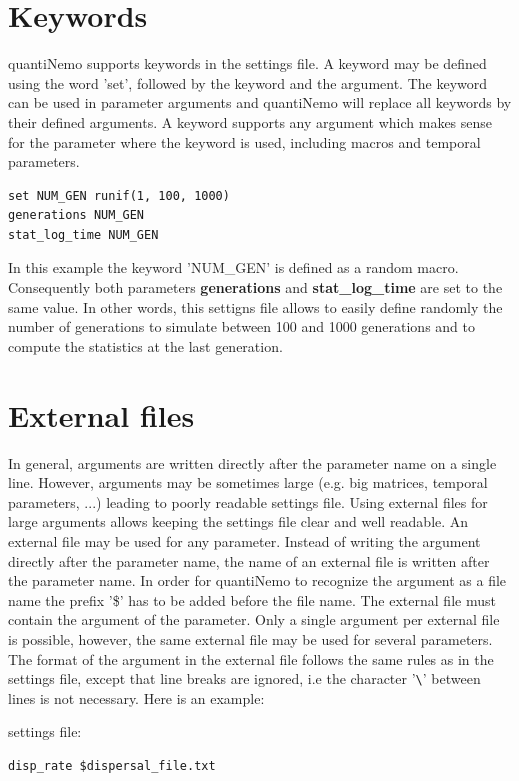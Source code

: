\documentclass[letterpaper,12pt,oneside]{book}
\begin{document}
\section{Keywords}
quantiNemo supports keywords in the settings file. A keyword may be defined using the word 'set', followed by the keyword and the argument. The keyword can be used in parameter arguments and quantiNemo will replace all keywords by their defined arguments. A keyword supports any argument which makes sense for the parameter where the keyword is used, including macros and temporal parameters.

\begin{lstlisting}[frame=single]
set NUM_GEN runif(1, 100, 1000)
generations NUM_GEN
stat_log_time NUM_GEN
\end{lstlisting}
In this example the keyword 'NUM\_GEN' is defined as a random macro. Consequently both parameters \textbf{generations} and \textbf{stat\_log\_time} are set to the same value. In other words, this settigns file allows to easily define randomly the number of generations to simulate between 100 and 1000 generations and to compute the statistics at the last generation.

\section{External files} \index{\$}
In general, arguments are written directly after the parameter name on a single line. However, arguments may be sometimes large (e.g. big matrices, temporal parameters, ...) leading to poorly readable settings file. Using external files for large arguments allows keeping the settings file clear and well readable. An external file may be used for any parameter. Instead of writing the argument directly after the parameter name, the name of an external file is written after the parameter name. In order for quantiNemo to recognize the argument as a file name the prefix '\$' has to be added before the file name. The external file must contain the argument of the parameter. Only a single argument per external file is possible, however, the same external file may be used for several parameters. The format of the argument in the external file follows the same rules as in the settings file, except that line breaks are ignored, i.e the character '\verb"\"' between lines is not necessary. Here is an example:

settings file:
\begin{lstlisting}[frame=single]
disp_rate $dispersal_file.txt
\end{lstlisting}
\end{document}
